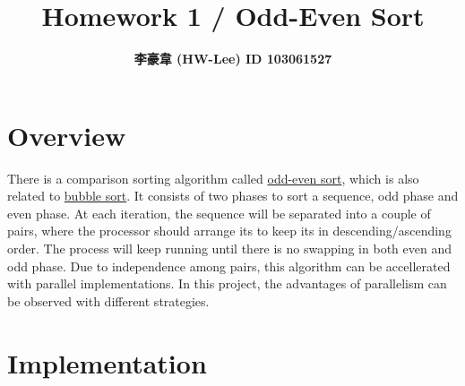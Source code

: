 \documentclass[12pt]{article}
\title{\textbf{Homework 1 / Odd-Even Sort}}
\author{\textbf{李豪韋 (HW-Lee) ID 103061527}}
\date{}
\begin{document}
\vspace*{-70pt}
{\let\newpage\relax\maketitle}
\thispagestyle{title}
\vspace*{-40pt}

\section*{Overview}
\vspace{-20pt}
\noindent\makebox[\linewidth]{\rule{\textwidth}{0.4pt}}
\vspace{-5pt}

There is a comparison sorting algorithm called \href{https://en.wikipedia.org/wiki/Odd\%E2\%80\%93even_sort}{odd-even sort}, which is also related to \href{https://en.wikipedia.org/wiki/Bubble_sort}{bubble sort}. It consists of two phases to sort a sequence, odd phase and even phase. At each iteration, the sequence will be separated into a couple of pairs, where the processor should arrange its to keep its in descending/ascending order. The process will keep running until there is no swapping in both even and odd phase. Due to independence among pairs, this algorithm can be accellerated with parallel implementations. In this project, the advantages of parallelism can be observed with different strategies.

\vspace{-5pt}
\section*{Implementation}
\vspace{-20pt}
\noindent\makebox[\linewidth]{\rule{\textwidth}{0.4pt}}
\end{document}

